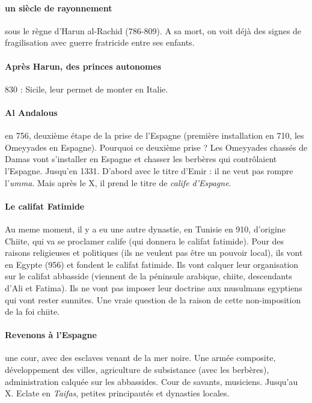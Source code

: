 \paragraph{un siècle de rayonnement} sous le règne d'Harun al-Rachid (786-809). A sa mort, on voit déjà des signes de fragilisation avec guerre fratricide entre ses enfants. 


\paragraph{Après Harun, des princes autonomes}  830 : Sicile, leur permet de monter en Italie. 

\paragraph{Al Andalous} en 756, deuxième étape de la prise de l'Espagne (première installation en 710, les Omeyyades en Espagne). Pourquoi ce deuxième prise ? Les Omeyyades chassés de Damas vont s'installer en Espagne et chasser les berbères qui contrôlaient l'Espagne. Jusqu'en 1331. D'abord avec le titre d'Emir : il ne veut pas rompre l'\textit{umma}. Mais après le X, il prend le titre de \textit{calife d'Espagne}. 

\paragraph{Le califat Fatimide } Au meme moment, il y a eu une autre dynastie, en Tunisie en 910, d'origine Chiite, qui va se proclamer calife (qui donnera le califat fatimide). Pour des raisons religieuses et politiques (ils ne veulent pas être un pouvoir local), ils vont en Egypte (956) et fondent le califat fatimide.   Ils vont calquer leur organisation sur le califat abbasside (viennent de la péninsule arabique, chiite, descendants d'Ali et Fatima). Ils ne vont pas imposer leur doctrine aux musulmans egyptiens qui vont rester sunnites.  Une vraie question de la raison de cette non-imposition de la foi chiite.

\paragraph{Revenons à l'Espagne} une cour, avec des esclaves venant de la mer noire. Une armée composite, développement des villes, agriculture de subsistance (avec les berbères), administration calquée sur les abbassides. Cour de savants, musiciens. Jusqu'au X. Eclate en \textit{Taifas}, petites principautés et dynasties locales. 

